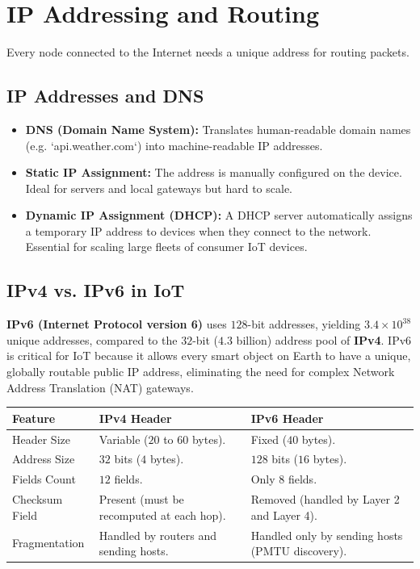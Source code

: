 \documentclass[12pt,a4paper]{article}
\renewcommand{\arraystretch}{1.45}
\begin{document}
\section{IP Addressing and Routing}

Every node connected to the Internet needs a unique address for routing packets.

\subsection{IP Addresses and DNS}
\begin{itemize}[leftmargin=*, itemsep=3pt]
  \item \textbf{DNS (Domain Name System):} Translates human-readable domain names (e.g. `api.weather.com`) into machine-readable IP addresses.
  \item \textbf{Static IP Assignment:} The address is manually configured on the device. Ideal for servers and local gateways but hard to scale.
  \item \textbf{Dynamic IP Assignment (DHCP):} A DHCP server automatically assigns a temporary IP address to devices when they connect to the network. Essential for scaling large fleets of consumer IoT devices.
\end{itemize}

\subsection{IPv4 vs. IPv6 in IoT}
\begin{tcolorbox}[defbox, title={IPv6 Importance in IoT}]
  \textbf{IPv6 (Internet Protocol version 6)} uses $128$-bit addresses, yielding $3.4 \times 10^{38}$ unique addresses, compared to the $32$-bit ($4.3$ billion) address pool of \textbf{IPv4}. IPv6 is critical for IoT because it allows every smart object on Earth to have a unique, globally routable public IP address, eliminating the need for complex Network Address Translation (NAT) gateways.
\end{tcolorbox}

\par\vspace{6pt}\noindent
{\renewcommand{\arraystretch}{1.3}%
\begin{tabularx}{\linewidth}{|B{3.0cm}|Y|Y|}
\hline
\textbf{Feature} & \textbf{IPv4 Header} & \textbf{IPv6 Header} \\
\hline
Header Size & Variable ($20$ to $60$ bytes). & Fixed ($40$ bytes). \\
\hline
Address Size & $32$ bits ($4$ bytes). & $128$ bits ($16$ bytes). \\
\hline
Fields Count & $12$ fields. & Only $8$ fields. \\
\hline
Checksum Field & Present (must be recomputed at each hop). & Removed (handled by Layer 2 and Layer 4). \\
\hline
Fragmentation & Handled by routers and sending hosts. & Handled only by sending hosts (PMTU discovery). \\
\hline
\end{tabularx}}
\end{document}
